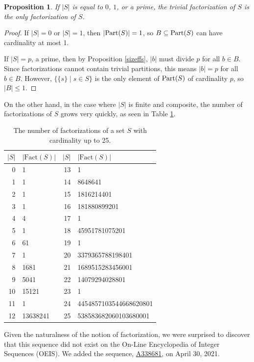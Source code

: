\documentclass[authordate,onecolumn]{miri-tech-article}
\newtheorem{proposition}{Proposition}
\begin{document}
\begin{proposition}\label{templabel5}
If $|S|$ is equal to $0$, $1$, or a prime, the trivial factorization of $S$ is the only factorization of $S$.
\end{proposition}
\begin{proof}
If $|S|=0$ or $|S|=1$, then $|\text{Part}(S)|=1$, so $B\subseteq\text{Part}(S)$ can have cardinality at most 1.

If $|S|=p$, a prime, then by Proposition \ref{sizeffs}, $|b|$ must divide $p$ for all $b\in B$. Since factorizations cannot contain trivial partitions, this means $|b|=p$ for all $b\in B$. However, $\{\{s\}\mid s\in S\}$ is the only element of $\text{Part}(S)$ of cardinality $p$, so $|B|\leq 1$.
\end{proof}
On the other hand, in the case where $|S|$ is finite and composite, the number of factorizations of $S$ grows very quickly, as seen in Table \ref{tab:my_label}.
\begin{table}[ht]
    \centering
    \begin{tabular}{|r|l||r|l|}
    \hline
        $|S|$ & $|\text{Fact}(S)|$ & $|S|$  & $|\text{Fact}(S)|$ \\
    \hline
        0 & 1 & 13 & 1\\
        1 & 1 & 14 & 8648641\\
        2 & 1 & 15 & 1816214401\\
        3 & 1 & 16 & 181880899201\\
        4 & 4 & 17 & 1\\
        5 & 1 & 18 & 45951781075201\\
        6 & 61 & 19 & 1\\
        7 & 1 & 20 & 3379365788198401\\
        8 & 1681 & 21 & 1689515283456001\\
        9 & 5041 & 22 & 14079294028801\\
        10 & 15121 & 23 & 1\\
        11 & 1 & 24 & 4454857103544668620801\\
        12 & 13638241 & 25 & 538583682060103680001\\
    \hline
    \end{tabular}
    \caption{The number of factorizations of a set $S$ with cardinality up to 25.}
    \label{tab:my_label}
\end{table}
\linebreak
\noindent
Given the naturalness of the notion of factorization, we were surprised to discover that this sequence did not exist on the On-Line Encyclopedia of Integer Sequences (OEIS). We added the sequence, \href{https://oeis.org/A338681}{A338681}, on April 30, 2021.\nocite{OEIS:2021}
\end{document}
